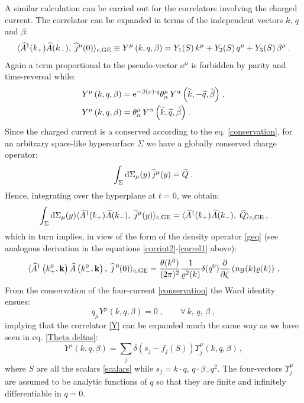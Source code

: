\documentclass[prd,superscriptaddress,nofootinbib,notitlepage]{revtex4-1}
\def\wj{{\widehat j}}
\def\wA{{\widehat A}}
\def\wQ{{\widehat Q}}
\def\wA{\widehat A}
\def\wAd{\widehat A^{\dagger}}
\def\wQ{\widehat Q}
\newcommand{\e}{{\rm e}}
\newcommand{\di}{{\rm d}}
\begin{document}
A similar calculation can be carried out for the correlators involving the charged current. The correlator can be 
expanded in terms of the independent vectors $k,\,q$ and $\beta$:
%
\begin{equation}\label{Y}
        \langle\wAd(k_+)\wA(k_-),\;\wj^\mu(0)\rangle_{c,\rm GE} \equiv Y^\mu\left(k,q,\beta\right)=Y_1(S)\,k^\mu+Y_2(S)\, q^\mu+Y_3(S)\,\beta^\mu\,.
\end{equation}
%
Again a term proportional to the pseudo-vector $a^\mu$ is forbidden by parity and time-reversal while:
%
\begin{subequations}\label{Ypar}
    \begin{align}
        Y^\mu\left(k,q,\beta\right)&=\e^{-\beta(x)\cdot q}\theta^\mu_\alpha\, Y^\alpha\left(\widetilde{k},-\widetilde{q},\widetilde{\beta}\right)\,,\\
        Y^\mu\left(k,q,\beta\right)&=\theta^\mu_\alpha\, Y^\alpha\left(\widetilde{k},\widetilde{q},\widetilde{\beta}\right)\,.
    \end{align}
\end{subequations}
%
Since the charged current is a conserved according to the eq. \eqref{conservation}, for an arbitrary space-like hypersurface 
$\Sigma$ we have a globally conserved charge operator:
%
\begin{equation}\label{integral current}
    \int_{\Sigma}\di\Sigma_\mu(y)\,\wj^\mu(y)=\wQ\;.
\end{equation}
%
Hence, integrating over the hyperplane at $t=0$, we obtain: 
%
\begin{equation*}
    \int_{\Sigma}\di\Sigma_\mu(y)\langle\wAd(k_+)\wA(k_-),\;\wj^\mu(y)\rangle_{c,\rm GE}=\langle\wAd(k_+)\wA(k_-),\;\wQ\rangle_{c,\rm GE}\,,
\end{equation*}
%
which in turn implies, in view of the form of the density operator \eqref{geq} (see analogous derivation in the
equations \eqref{corrint2}-\eqref{correl1} above):
%
\begin{equation}\label{Y0}
    \langle\wAd\left(k^0_+,{\bf k}\right)\wA\left(k^0_-,{\bf k}\right),\;\wj^{\,0}(0)\rangle_{c,\rm GE}=\frac{\theta(k^0)}{(2\pi)^2}\frac{1}{\varrho^2(k)}\delta(q^0) \frac{\partial}{\partial\zeta}\left(n_{\rm B}(k)\varrho(k)\right)\,.
\end{equation}
%
From the conservation of the four-current \eqref{conservation} the Ward identity ensues:
%
\begin{equation*}
    q_\mu Y^\mu\left(k,q,\beta\right)=0\;,\qquad\forall\,k,\, q,\, \beta\;,
\end{equation*}
%
implying that the correlator \eqref{Y} can be expanded much the same way as we have seen in eq. \eqref{Theta deltas}:
%
\begin{equation}\label{Ydeltas}
    Y^\mu\left(k,q,\beta\right)=\sum_{j}\delta\left(s_j-f_j(S)\right)\Upsilon^\mu_{j}\left(k,q,\beta\right)\,,
\end{equation}
%
where $S$ are all the scalars \eqref{scalars} while $s_j=k\cdot q,\, q\cdot\beta\,,q^2 $. The four-vectors $\Upsilon^\mu_{j}$ 
are assumed to be analytic functions of $q$ so that they are finite and infinitely differentiable in $q=0$.
\end{document}
